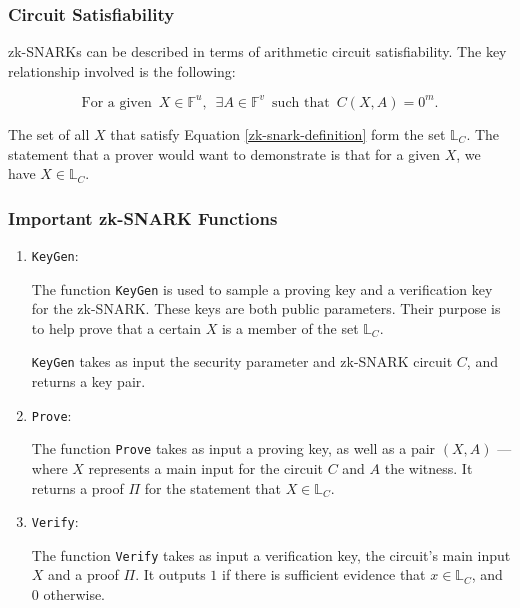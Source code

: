 \documentclass{article}
\begin{document}
\subsubsection{Circuit Satisfiability}
zk-SNARKs can be described in terms of arithmetic circuit satisfiability. The key relationship involved is the following:

\begin{equation}
\text{For a given} \,\,\, X \in \mathbb{F}^u, \,\,\, \exists A \in \mathbb{F}^v \,\,\, \text{such that} \,\,\, C(X, A) = 0^{m}.
\label{zk-snark-definition}
\end{equation}
\newline

The set of all $X$ that satisfy Equation \ref{zk-snark-definition} form the set $\mathbb{L}_C$. The statement that a prover would want to demonstrate is that for a given $X$, we have $X \in \mathbb{L}_C$.

\subsubsection{Important zk-SNARK Functions}

\begin{enumerate}

\item {\texttt{KeyGen}}:

The function \texttt{KeyGen} is used to sample a proving key and a verification key for the zk-SNARK. These keys are both public parameters. Their purpose is to help prove that a certain $X$ is a member of the set $\mathbb{L}_C$.

\texttt{KeyGen} takes as input the security parameter and zk-SNARK circuit $C$, and returns a key pair.

\item {\texttt{Prove}}:

The function \texttt{Prove} takes as input a proving key, as well as a pair $(X, A)$ --- where $X$ represents a main input for the circuit $C$ and $A$ the witness. It returns a proof $\Pi$ for the statement that $X \in \mathbb{L}_C$.

\item {\texttt{Verify}}:

The function \texttt{Verify} takes as input a verification key, the circuit's main input $X$ and a proof $\Pi$. It outputs $1$ if there is sufficient evidence that $x \in \mathbb{L}_C$, and 0 otherwise.

\end{enumerate}
\end{document}
